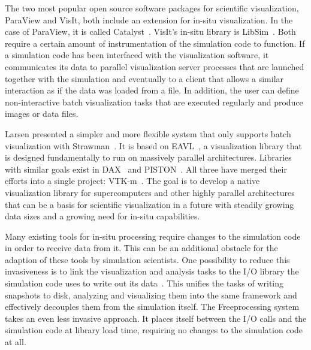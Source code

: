%
The two most popular open source software packages for scientific visualization,
ParaView and VisIt, both include an extension for in-situ visualization.
%
In the case of ParaView, it is called Catalyst~\cite{Ayachit2015}.
%
VisIt's in-situ library is LibSim~\cite{Whitlock2011}.
%
Both require a certain amount of instrumentation of the simulation code to
function.
%
If a simulation code has been interfaced with the visualization software, it
communicates its data to parallel visualization server processes that are
launched together with the simulation and eventually to a client that
allows a similar interaction as if the data was loaded from a file.
%
In addition, the user can define non-interactive batch visualization tasks that
are executed regularly and produce images or data files.
%

%
Larsen \etal presented a simpler and more flexible system that only supports
batch visualization with Strawman~\cite{Larsen2015}.
%
It is based on EAVL~\cite{Meredith2012}, a visualization library that is
designed fundamentally to run on massively parallel architectures.
%
Libraries with similar goals exist in DAX~\cite{Moreland2011} and
PISTON~\cite{Lo2012}.
%
All three have merged their efforts into a single project:
VTK-m~\cite{Moreland2016}.
%
The goal is to develop a native visualization library for supercomputers and
other highly parallel architectures that can be a basis for scientific
visualization in a future with steadily growing data sizes and a growing need
for in-situ capabilities.
%

%
Many existing tools for in-situ processing require changes to the simulation
code in order to receive data from it.
%
This can be an additional obstacle for the adaption of these tools by simulation
scientists.
%
One possibility to reduce this invasiveness is to link the visualization and
analysis tasks to the I/O library the simulation code uses to write out its
data~\cite{Vishwanath2011,Biddiscombe2011,Dorier2013}.
%
This unifies the tasks of writing snapshots to disk, analyzing and visualizing
them into the same framework and effectively decouples them from the simulation
itself.
%
The Freeprocessing system~\cite{Fogal2014} takes an even less invasive approach.
%
It places itself between the I/O calls and the simulation code at library load
time, requiring no changes to the simulation code at all.
%

